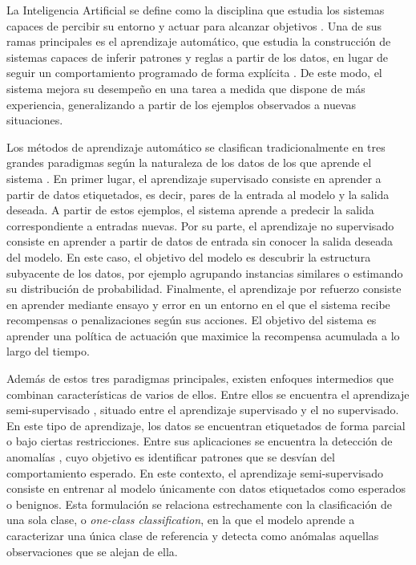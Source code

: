 \documentclass[12pt]{extarticle}
\numberwithin{equation}{section}
\begin{document}
\begin{refsection}
La Inteligencia Artificial se define como la disciplina que estudia los sistemas capaces de percibir su entorno y actuar para alcanzar objetivos \cite{russell2021artificial}. Una de sus ramas principales es el aprendizaje automático, que estudia la construcción de sistemas capaces de inferir patrones y reglas a partir de los datos, en lugar de seguir un comportamiento programado de forma explícita \cite{bishop2006pattern}. De este modo, el sistema mejora su desempeño en una tarea a medida que dispone de más experiencia, generalizando a partir de los ejemplos observados a nuevas situaciones.

Los métodos de aprendizaje automático se clasifican tradicionalmente en tres grandes paradigmas según la naturaleza de los datos de los que aprende el sistema \cite{bishop2006pattern}. En primer lugar, el aprendizaje supervisado consiste en aprender a partir de datos etiquetados, es decir, pares de la entrada al modelo y la salida deseada. A partir de estos ejemplos, el sistema aprende a predecir la salida correspondiente a entradas nuevas. Por su parte, el aprendizaje no supervisado consiste en aprender a partir de datos de entrada sin conocer la salida deseada del modelo. En este caso, el objetivo del modelo es descubrir la estructura subyacente de los datos, por ejemplo agrupando instancias similares o estimando su distribución de probabilidad. Finalmente, el aprendizaje por refuerzo consiste en aprender mediante ensayo y error en un entorno en el que el sistema recibe recompensas o penalizaciones según sus acciones. El objetivo del sistema es aprender una política de actuación que maximice la recompensa acumulada a lo largo del tiempo.

Además de estos tres paradigmas principales, existen enfoques intermedios que combinan características de varios de ellos. Entre ellos se encuentra el aprendizaje semi-supervisado \cite{chapelle2006semi}, situado entre el aprendizaje supervisado y el no supervisado. En este tipo de aprendizaje, los datos se encuentran etiquetados de forma parcial o bajo ciertas restricciones. Entre sus aplicaciones se encuentra la detección de anomalías \cite{chandola2009anomaly}, cuyo objetivo es identificar patrones que se desvían del comportamiento esperado. En este contexto, el aprendizaje semi-supervisado consiste en entrenar al modelo únicamente con datos etiquetados como esperados o benignos. Esta formulación se relaciona estrechamente con la clasificación de una sola clase, o \textit{one-class classification}, en la que el modelo aprende a caracterizar una única clase de referencia y detecta como anómalas aquellas observaciones que se alejan de ella.


\end{refsection}
\end{document}
